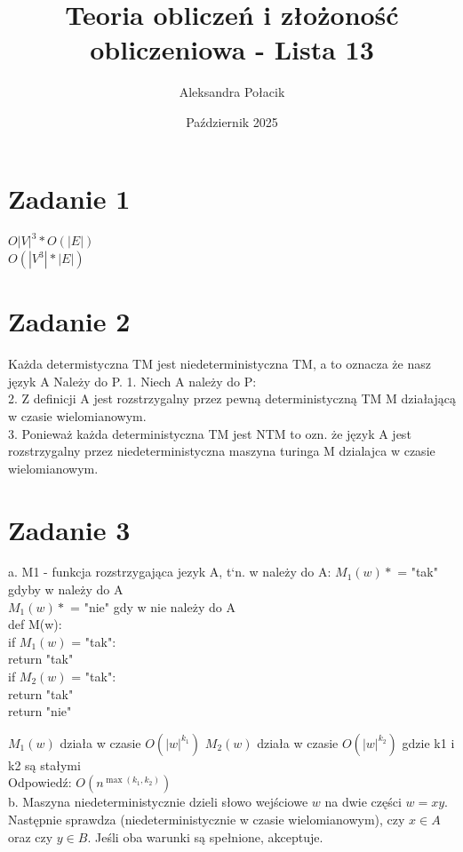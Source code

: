\documentclass{article}
\title{Teoria obliczeń i złożoność obliczeniowa - Lista 13}
\author{Aleksandra Połacik}
\date{Październik 2025}
\begin{document}
\maketitle


\section{Zadanie 1}
$O|V|^3 * O (|E|)$ \\
$O(|V^3|*|E|)$

\section{Zadanie 2}

Każda determistyczna TM jest niedeterministyczna TM, a to oznacza że nasz język A Należy do P.
1. Niech A należy do P: \\
2. Z definicji A jest rozstrzygalny przez pewną deterministyczną TM M działającą w czasie wielomianowym. \\
3. Ponieważ każda deterministyczna TM jest NTM to ozn. że język A jest rozstrzygalny przez niedeterministyczna maszyna turinga M dzialajca w czasie wielomianowym. \\

\section{Zadanie 3}

a. M1 - funkcja rozstrzygająca jezyk A, t`n. w należy do A:
$M_1(w)*$ = "tak" gdyby w należy do A \\
$M_1(w)*$ = "nie" gdy w nie należy do A  \\

def M(w): \\
    if $M_1(w)$ = "tak": \\
        return "tak" \\
    if $M_2(w)$ = "tak":   \\
        return "tak" \\
    return "nie"


$M_1(w)$ działa w czasie $O(|w|^{k_1})$
$M_2(w)$ działa w czasie $O(|w|^{k_2})$ gdzie k1 i k2 są stałymi \\

Odpowiedź: $O\!\left(n^{\max(k_1, k_2)}\right)$ \\


b. Maszyna niedeterministycznie dzieli słowo wejściowe $w$ na dwie części $w = xy$. Następnie sprawdza (niedeterministycznie w czasie wielomianowym), czy $x \in A$ oraz czy $y \in B$. Jeśli oba warunki są spełnione, akceptuje.
\end{document}
